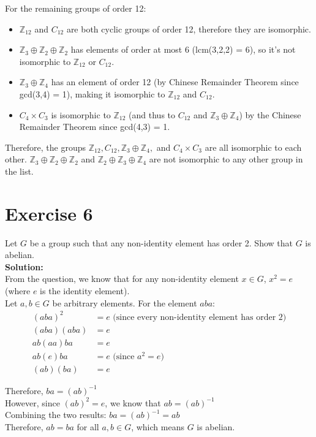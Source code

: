 \documentclass{article}
\begin{document}
For the remaining groups of order 12:
   \begin{itemize}
   \item $\mathbb{Z}_{12}$ and $C_{12}$ are both cyclic groups of order 12, therefore they are isomorphic.
   
   \item $\mathbb{Z}_3 \oplus \mathbb{Z}_2 \oplus \mathbb{Z}_2$ has elements of order at most 6 (lcm(3,2,2) = 6), so it's not isomorphic to $\mathbb{Z}_{12}$ or $C_{12}$.
   
   \item $\mathbb{Z}_3 \oplus \mathbb{Z}_4$ has an element of order 12 (by Chinese Remainder Theorem since gcd(3,4) = 1), making it isomorphic to $\mathbb{Z}_{12}$ and $C_{12}$.
   
   \item $C_4 \times C_3$ is isomorphic to $\mathbb{Z}_{12}$ (and thus to $C_{12}$ and $\mathbb{Z}_3 \oplus \mathbb{Z}_4$) by the Chinese Remainder Theorem since gcd(4,3) = 1.
   \end{itemize}

Therefore, the groups $\mathbb{Z}_{12}, C_{12}, \mathbb{Z}_3 \oplus \mathbb{Z}_4,$ and $C_4 \times C_3$ are all isomorphic to each other.
$\mathbb{Z}_3 \oplus \mathbb{Z}_2 \oplus \mathbb{Z}_2$ and $\mathbb{Z}_2 \oplus \mathbb{Z}_3 \oplus \mathbb{Z}_4$ are not isomorphic to any other group in the list.

\newpage

\section*{Exercise 6}
Let $G$ be a group such that any non-identity element has order 2. Show that $G$ is abelian. \\

\textbf{Solution:} \\

From the question, we know that for any non-identity element $x \in G$, $x^2 = e$ (where $e$ is the identity element). \\

Let $a,b \in G$ be arbitrary elements. For the element $aba$:
\begin{align*}
(aba)^2 &= e \text{ (since every non-identity element has order 2)} \\
(aba)(aba) &= e \\
ab(aa)ba &= e \\
ab(e)ba &= e \text{ (since } a^2 = e) \\
(ab)(ba) &= e
\end{align*}

Therefore, $ba = (ab)^{-1}$ \\

However, since $(ab)^2 = e$, we know that $ab = (ab)^{-1}$ \\

Combining the two results:
$ba = (ab)^{-1} = ab$ \\

Therefore, $ab = ba$ for all $a,b \in G$, which means $G$ is abelian.
\end{document}
